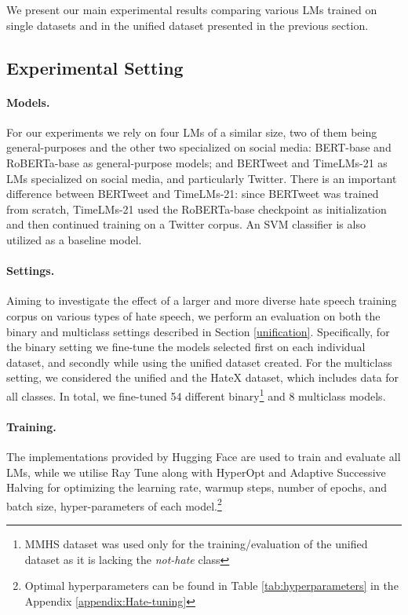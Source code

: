 We present our main experimental results comparing various \acp{LM} trained on single datasets and in the unified dataset presented in the previous section.

    \subsection{Experimental Setting}

    \paragraph{Models.} For our experiments we rely on four \acp{LM} of a similar size, two of them being general-purposes and the other two specialized on social media: BERT-base \cite{BERT} and RoBERTa-base \cite{ROBERTA} as general-purpose models; and BERTweet \cite{bertweet} and TimeLMs-21 \cite{loureiro-etal-2022-timelms} as \acp{LM} specialized on social media, and particularly Twitter. There is an important difference between BERTweet and TimeLMs-21: since BERTweet was trained from scratch, TimeLMs-21 used the RoBERTa-base checkpoint as initialization and then continued training on a Twitter corpus. An SVM classifier is also utilized as a baseline model. 
    
     \paragraph{Settings.} Aiming to investigate the effect of a larger and more diverse hate speech training corpus on various types of hate speech, we perform an evaluation on both the binary and multiclass settings described in Section \ref{unification}. Specifically, for the binary setting we fine-tune the models selected first on each individual dataset, and secondly while using the unified dataset created. For the multiclass setting, we considered the unified and the HateX dataset, which includes data for all classes. In total, we fine-tuned 54 different binary\footnote{MMHS dataset was used only for the training/evaluation of the unified dataset as it is lacking the \textit{not-hate} class} and 8 multiclass models.


     \paragraph{Training.} The implementations provided by Hugging Face \cite{wolf-etal-2020-transformers} are used to train and evaluate all \acp{LM}, while we utilise Ray Tune \cite{liaw2018tune} along with HyperOpt \cite{bergstra2022hyperopt} and Adaptive Successive Halving \cite{li2018massively} for optimizing the learning rate, warmup steps, number of epochs, and batch size, hyper-parameters of each model.\footnote{Optimal hyperparameters can be found in Table \ref{tab:hyperparameters} in the Appendix \ref{appendix:Hate-tuning}}


